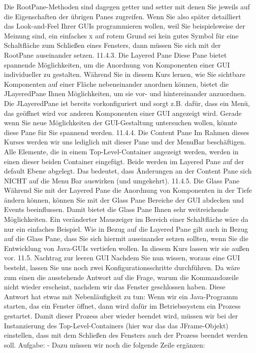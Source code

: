 Die RootPane-Methoden sind dagegen getter und setter mit denen Sie jeweils auf die Eigenschaften der übrigen Panes zugreifen. Wenn Sie also später detailliert das Look-and-Feel Ihrer GUIs programmieren wollen, weil Sie beispielsweise der Meinung sind, ein einfaches x auf rotem Grund sei kein gutes Symbol für eine Schaltfläche zum Schließen eines Fensters, dann müssen Sie sich mit der RootPane auseinander setzen.
11.4.3.	Die Layered Pane
Diese Pane bietet spannende Möglichkeiten, um die Anordnung von Komponenten einer GUI individueller zu gestalten. Während Sie in diesem Kurs lernen, wie Sie sichtbare Komponenten auf einer Fläche nebeneinander anordnen können, bietet die JLayeredPane Ihnen Möglichkeiten, um sie vor- und hintereinander anzuordnen. Die JLayeredPane ist bereits vorkonfiguriert und sorgt z.B. dafür, dass ein Menü, das geöffnet wird vor anderen Komponenten einer GUI angezeigt wird. 
Gerade wenn Sie neue Möglichkeiten der GUI-Gestaltung untersuchen wollen, könnte diese Pane für Sie spannend werden.
11.4.4.	Die Content Pane
Im Rahmen dieses Kurses werden wir uns lediglich mit dieser Pane und der MenuBar beschäftigen. Alle Elemente, die in einem Top-Level-Container angezeigt werden, werden in einen dieser beiden Container eingefügt.
Beide werden im Layered Pane auf der default Ebene abgelegt. Das bedeutet, dass Änderungen an der Content Pane sich NICHT auf die Menu Bar auswirken (und umgekehrt).
11.4.5.	Die Glass Pane
Während Sie mit der Layered Pane die Anordnung von Komponenten in der Tiefe ändern können, können Sie mit der Glass Pane Bereiche der GUI abdecken und Events beeinflussen. Damit bietet die Glass Pane Ihnen sehr weitreichende Möglichkeiten. Ein veränderter Mauszeiger im Bereich einer Schaltfläche wäre da nur ein einfaches Beispiel.
Wie in Bezug auf die Layered Pane gilt auch in Bezug auf die Glass Pane, dass Sie sich hiermit auseinander setzen sollten, wenn Sie die Entwicklung von Java-GUIs vertiefen wollen. In diesem Kurs lassen wir sie außen vor.
11.5.	Nachtrag zur leeren GUI
Nachdem Sie nun wissen, woraus eine GUI besteht, lassen Sie uns noch zwei Konfigurationsschritte durchführen.
Da wäre zum einen die ausstehende Antwort auf die Frage, warum die Kommandozeile nicht wieder erscheint, nachdem wir das Fenster geschlossen haben. Diese Antwort hat etwas mit Nebenläufigkeit zu tun: Wenn wir ein Java-Programm starten, das ein Fenster öffnet, dann wird dafür im Betriebssystem ein Prozess gestartet. Damit dieser Prozess aber wieder beendet wird, müssen wir bei der Instanzierung des Top-Level-Containers (hier war das das JFrame-Objekt) einstellen, dass mit dem Schließen des Fensters auch der Prozess beendet werden soll. 
Aufgabe:
-	Dazu müssen wir noch die folgende Zeile ergänzen:

